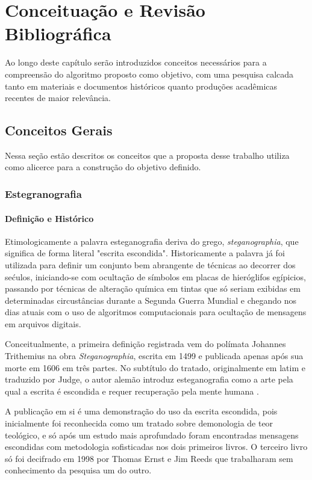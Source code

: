 \chapter{Conceituação e Revisão Bibliográfica}\label{cap:conceitos}

Ao longo deste capítulo serão introduzidos conceitos necessários para a compreensão do algoritmo proposto como objetivo, com uma pesquisa calcada tanto em materiais e documentos históricos quanto produções acadêmicas recentes de maior relevância.

\section{Conceitos Gerais}
Nessa seção estão descritos os conceitos que a proposta desse trabalho utiliza como alicerce para a construção do objetivo definido.

\subsection{Estegranografia}

\subsubsection{Definição e Histórico}

Etimologicamente a palavra esteganografia deriva do grego, \textit{steganographia}, que significa de forma literal "escrita escondida". Historicamente a palavra já foi utilizada para definir um conjunto bem abrangente de técnicas ao decorrer dos sećulos, iniciando-se com ocultação de símbolos em placas de hieróglifos egípicios, passando por técnicas de alteração química em tintas que só seriam exibidas em determinadas circustâncias durante a Segunda Guerra Mundial e chegando nos dias atuais com o uso de algoritmos computacionais para ocultação de mensagens em arquivos digitais.

Conceitualmente, a primeira definição registrada vem do polímata Johannes Trithemius na obra \textit{Steganographia}, escrita em 1499 e publicada apenas após sua morte em 1606 em três partes. No subtítulo do tratado, originalmente em latim e traduzido por Judge, o autor alemão introduz esteganografia como a arte pela qual a escrita é escondida e requer recuperação pela mente humana \cite{judge}.

A publicação em si é uma demonstração do uso da escrita escondida, pois inicialmente foi reconhecida como um tratado sobre demonologia de teor teológico, e só após um estudo mais aprofundado foram encontradas mensagens escondidas com metodologia sofisticadas nos dois primeiros livros. O terceiro livro só foi decifrado em 1998 por Thomas Ernst \cite{ernst} e Jim Reeds \cite{reeds} que trabalharam sem conhecimento da pesquisa um do outro.

